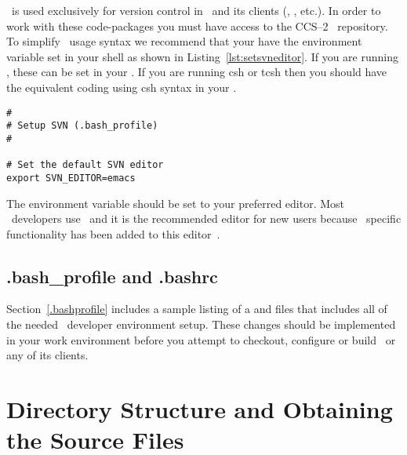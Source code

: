 \svn\ is used exclusively for version control in \draco\ and its
clients (\capsaicin, \milagro, etc.).  In order to work with
these code-packages you must have access to the CCS--2 \svn\ 
repository.  To simplify \svn\ usage syntax we recommend that your
have the \comp{SVN\_EDITOR} environment variable set in your shell as shown in Listing~\ref{lst:setsvneditor}.  If you
are running \bash, these can be set in your \comp{.bash\_profile}.
If you are running csh or tcsh then you should have the equivalent
coding using csh syntax in your \comp{.cshrc}.
%
\begin{lstlisting}[basicstyle=\footnotesize, xleftmargin=0.0in, xrightmargin=0.0in, caption={Setting the default SVN editor in the .bashrc file.}, float=tn,label={lst:setsvneditor}]
#
# Setup SVN (.bash_profile)
#

# Set the default SVN editor
export SVN_EDITOR=emacs
\end{lstlisting}
%

%
The  environment variable should be set to your
preferred editor.  Most \draco\ developers use \emacs\ and it is the
recommended editor for new users because \draco\ specific
functionality has been added to this editor~\cite{xtm:9909}.

\subsection{.bash\_profile and .bashrc}

Section~\ref{.bashprofile} includes a sample listing of a
 and  files that includes all of
the needed \draco\ developer environment setup.  These changes should
be implemented in your work environment before you attempt to
checkout, configure or build \draco\ or any of its clients.


\section{Directory Structure and Obtaining the Source Files}

